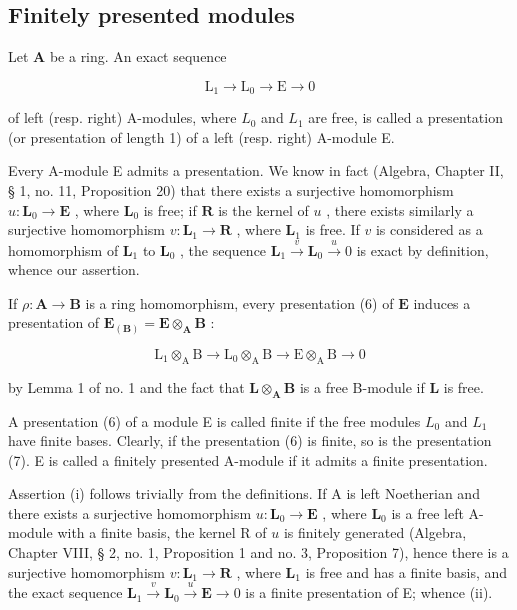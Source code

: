 \subsection{Finitely presented modules}

Let \(\mathbf{A}\) be a ring. An exact sequence

\[
\mathrm{L} _ {1} \rightarrow \mathrm{L} _ {0} \rightarrow \mathrm{E} \rightarrow 0\tag{6}
\]

of left (resp. right) A-modules, where \(L_{0}\) and \(L_{1}\) are free, is called a presentation (or presentation of length 1) of a left (resp. right) A-module E.

Every A-module E admits a presentation. We know in fact (Algebra, Chapter II, § 1, no. 11, Proposition 20) that there exists a surjective homomorphism \(u \colon \mathbf{L}_0 \to \mathbf{E}\) , where \(\mathbf{L}_0\) is free; if \(\mathbf{R}\) is the kernel of \(u\) , there exists similarly a surjective homomorphism \(v \colon \mathbf{L}_1 \to \mathbf{R}\) , where \(\mathbf{L}_1\) is free. If \(v\) is considered as a homomorphism of \(\mathbf{L}_1\) to \(\mathbf{L}_0\) , the sequence \(\mathbf{L}_1 \xrightarrow{v} \mathbf{L}_0 \xrightarrow{u} 0\) is exact by definition, whence our assertion.

If \(\rho: \mathbf{A} \to \mathbf{B}\) is a ring homomorphism, every presentation (6) of \(\mathbf{E}\) induces a presentation of \(\mathbf{E}_{(\mathbf{B})} = \mathbf{E} \otimes_{\mathbf{A}} \mathbf{B}\) :

\[
\mathrm{L} _ {1} \otimes_ {\mathrm{A}} \mathrm{B} \rightarrow \mathrm{L} _ {0} \otimes_ {\mathrm{A}} \mathrm{B} \rightarrow \mathrm{E} \otimes_ {\mathrm{A}} \mathrm{B} \rightarrow 0\tag{7}
\]

by Lemma 1 of no. 1 and the fact that \(\mathbf{L} \otimes_{\mathbf{A}} \mathbf{B}\) is a free B-module if \(\mathbf{L}\) is free.

A presentation (6) of a module E is called finite if the free modules \(L_{0}\) and \(L_{1}\) have finite bases. Clearly, if the presentation (6) is finite, so is the presentation (7). E is called a finitely presented A-module if it admits a finite presentation.

Assertion (i) follows trivially from the definitions. If A is left Noetherian and there exists a surjective homomorphism \(u \colon \mathbf{L}_0 \to \mathbf{E}\) , where \(\mathbf{L}_0\) is a free left A-module with a finite basis, the kernel R of \(u\) is finitely generated (Algebra, Chapter VIII, § 2, no. 1, Proposition 1 and no. 3, Proposition 7), hence there is a surjective homomorphism \(v \colon \mathbf{L}_1 \to \mathbf{R}\) , where \(\mathbf{L}_1\) is free and has a finite basis, and the exact sequence \(\mathbf{L}_1 \xrightarrow{v} \mathbf{L}_0 \xrightarrow{u} \mathbf{E} \to 0\) is a finite presentation of E; whence (ii).

